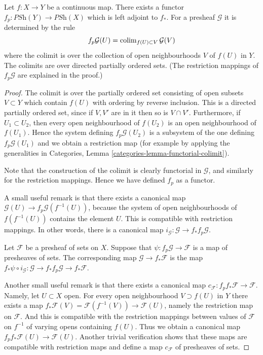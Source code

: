 \begin{lemma}
\label{lemma-pullback-presheaves}
Let $f : X \to Y$ be a continuous map.
There exists a functor
$f_p : \textit{PSh}(Y) \to \textit{PSh}(X)$
which is left adjoint to $f_*$. For a presheaf
$\mathcal{G}$ it is determined by the rule
$$
f_p\mathcal{G}(U) = \mathop{\mathrm{colim}}\nolimits_{f(U) \subset V} \mathcal{G}(V)
$$
where the colimit is over the collection of open neighbourhoods
$V$ of $f(U)$ in $Y$. The colimits are over
directed partially ordered sets.
(The restriction mappings of $f_p\mathcal{G}$ are explained in the proof.)
\end{lemma}

\begin{proof}
The colimit is over the partially ordered set consisting of open subsets
$V \subset Y$ which contain $f(U)$ with ordering by reverse inclusion.
This is a directed partially ordered set, since if $V, V'$ are in it then
so is $V \cap V'$. Furthermore, if
$U_1 \subset U_2$, then every open neighbourhood of $f(U_2)$
is an open neighbourhood of $f(U_1)$. Hence the system defining
$f_p\mathcal{G}(U_2)$ is a subsystem of the one defining
$f_p\mathcal{G}(U_1)$ and we obtain a restriction map (for
example by applying the generalities in Categories,
Lemma \ref{categories-lemma-functorial-colimit}).

\medskip\noindent
Note that the construction of the colimit is clearly functorial
in $\mathcal{G}$, and similarly for the restriction mappings.
Hence we have defined $f_p$ as a functor.

\medskip\noindent
A small useful remark is that there exists
a canonical map $\mathcal{G}(U) \to f_p\mathcal{G}(f^{-1}(U))$,
because the system of open neighbourhoods
of $f(f^{-1}(U))$ contains the element $U$. This is compatible
with restriction mappings. In other words, there is a
canonical map $i_\mathcal{G} : \mathcal{G} \to f_* f_p \mathcal{G}$.

\medskip\noindent
Let $\mathcal{F}$ be a presheaf of sets on $X$.
Suppose that $\psi : f_p\mathcal{G} \to \mathcal{F}$
is a map of presheaves of sets. The corresponding map
$\mathcal{G} \to f_*\mathcal{F}$ is the map
$f_*\psi \circ i_\mathcal{G} :
\mathcal{G} \to f_* f_p \mathcal{G} \to f_* \mathcal{F}$.

\medskip\noindent
Another small useful remark is that there exists a
canonical map $c_\mathcal{F} : f_p f_* \mathcal{F} \to \mathcal{F}$.
Namely, let $U \subset X$ open.
For every open neighbourhood $V \supset f(U)$ in $Y$
there exists a map
$f_*\mathcal{F}(V) = \mathcal{F}(f^{-1}(V))\to \mathcal{F}(U)$,
namely the restriction map on $\mathcal{F}$. And this is compatible
with the restriction mappings between values of $\mathcal{F}$
on $f^{-1}$ of varying opens containing $f(U)$. Thus we obtain
a canonical map $f_p f_* \mathcal{F}(U) \to \mathcal{F}(U)$.
Another trivial verification shows that these maps are compatible
with restriction maps and define a map $c_\mathcal{F}$
of presheaves of sets.


\end{proof}
